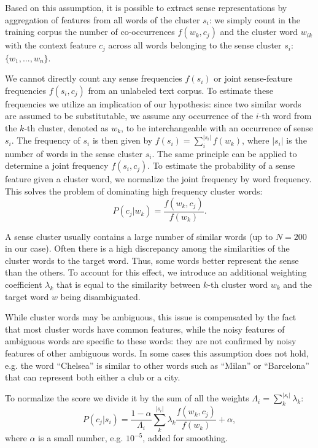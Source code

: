 \documentclass[11pt]{article}
\begin{document}
Based on this assumption, it is possible to extract sense representations by aggregation of features from all words of the cluster $s_i$: we simply count in the training corpus the number of co-occurrences $f(w_k,c_j)$ and the cluster word $w_{ik}$ with the context feature $c_j$ across all words belonging to the sense cluster $s_i$: $\{w_1,...,w_n\}$. 
 
We cannot directly count any sense frequencies $f(s_i)$ or joint sense-feature frequencies $f(s_i, c_j)$ from an unlabeled text corpus. To estimate these frequencies we utilize an implication of our hypothesis: since two similar words are assumed to be substitutable, we assume any occurrence of the $i$-th  word from the $k$-th cluster, denoted as $w_k$, to be interchangeable with an occurrence of sense $s_i$. The frequency of ${s_i}$ is then given by $f({s_i}) = \sum_i^{|s_i|}f(w_k)$, where $|s_i|$ is the number of words in the sense cluster $s_i$. The same principle can be applied to determine a joint frequency $f({s_i}, c_j)$. To estimate the probability of a sense feature given a cluster word, we normalize the joint frequency by word frequency. This solves the problem of dominating high frequency cluster words:
\begin{equation}
P(c_j|w_k) = \frac{\displaystyle f(w_k,c_j)}{\displaystyle f(w_k)}.
\end{equation}
 

A sense cluster usually contains a large number of similar words (up to $N = 200$ in our case). Often there is a high discrepancy among the similarities of the cluster words to the target word. Thus, some words better represent the sense than the others. To account for this effect, we introduce an additional weighting coefficient $\lambda_k$ that is equal to the similarity between $k$-th cluster word $w_k$ and the target word $w$ being disambiguated. 

While cluster words may be ambiguous, this issue is compensated by the fact that most cluster words have common features, while the  noisy features of ambiguous words are specific to these words: they are not confirmed by noisy features of other ambiguous words. In some cases this assumption does not hold, e.g. the word ``Chelsea'' is similar to other words such as ``Milan'' or ``Barcelona'' that can represent both either a club or a city.

To normalize the score we divide it by the sum of all the weights $\Lambda_i = \sum_k^{|s_i|} \lambda_k$:
\begin{equation}
P(c_j|{s_i}) = \frac{1-\alpha}{\Lambda_i} \sum_k^{|s_i|} \lambda_k \frac{\displaystyle f(w_k,c_j)}{\displaystyle f(w_k)}+ \alpha,
\end{equation}
where $\alpha$ is a small number, e.g. $10^{-5}$, added for smoothing. 
\end{document}
